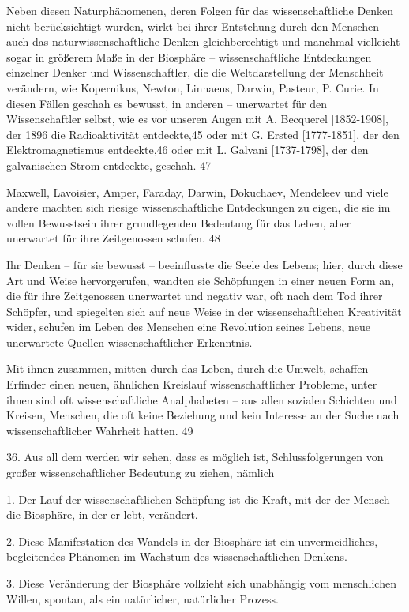 \documentclass[11pt,a4paper]{book}
\begin{document}
Neben diesen Naturphänomenen, deren Folgen für das wissenschaftliche Denken nicht berücksichtigt wurden, wirkt bei ihrer Entstehung durch den Menschen auch das naturwissenschaftliche Denken gleichberechtigt und manchmal vielleicht sogar in größerem Maße in der Biosphäre -- wissenschaftliche Entdeckungen einzelner Denker und Wissenschaftler, die die Weltdarstellung der Menschheit verändern, wie Kopernikus, Newton, Linnaeus, Darwin, Pasteur, P. Curie. In diesen Fällen geschah es bewusst, in anderen -- unerwartet für den Wissenschaftler selbst, wie es vor unseren Augen mit A. Becquerel [1852-1908], der 1896 die Radioaktivität entdeckte,45 oder mit G. Ersted [1777-1851], der den Elektromagnetismus entdeckte,46 oder mit L. Galvani [1737-1798], der den galvanischen Strom entdeckte, geschah. 47 

Maxwell, Lavoisier, Amper, Faraday, Darwin, Dokuchaev, Mendeleev und viele andere machten sich riesige wissenschaftliche Entdeckungen zu eigen, die sie im vollen Bewusstsein ihrer grundlegenden Bedeutung für das Leben, aber unerwartet für ihre Zeitgenossen schufen. 48 

Ihr Denken -- für sie bewusst -- beeinflusste die Seele des Lebens; hier, durch diese Art und Weise hervorgerufen, wandten sie Schöpfungen in einer neuen Form an, die für ihre Zeitgenossen unerwartet und negativ war, oft nach dem Tod ihrer Schöpfer, und spiegelten sich auf neue Weise in der wissenschaftlichen Kreativität wider, schufen im Leben des Menschen eine Revolution seines Lebens, neue unerwartete Quellen wissenschaftlicher Erkenntnis. 

Mit ihnen zusammen, mitten durch das Leben, durch die Umwelt, schaffen Erfinder einen neuen, ähnlichen Kreislauf wissenschaftlicher Probleme, unter ihnen sind oft wissenschaftliche Analphabeten -- aus allen sozialen Schichten und Kreisen, Menschen, die oft keine Beziehung und kein Interesse an der Suche nach wissenschaftlicher Wahrheit hatten. 49 

36. Aus all dem werden wir sehen, dass es möglich ist, Schlussfolgerungen von großer wissenschaftlicher Bedeutung zu ziehen, nämlich 

    1. Der Lauf der wissenschaftlichen Schöpfung ist die Kraft, mit der der Mensch die Biosphäre, in der er lebt, verändert. 

    2. Diese Manifestation des Wandels in der Biosphäre ist ein unvermeidliches, begleitendes Phänomen im Wachstum des wissenschaftlichen Denkens. 

    3. Diese Veränderung der Biosphäre vollzieht sich unabhängig vom menschlichen Willen, spontan, als ein natürlicher, natürlicher Prozess. 
\end{document}
